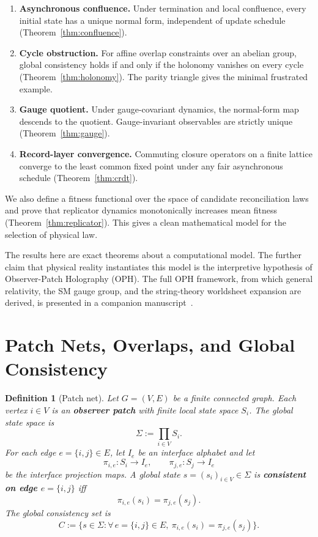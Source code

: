 \documentclass[11pt]{article}
\newtheorem{definition}[theorem]{Definition}
\begin{document}
\begin{enumerate}
\item \textbf{Asynchronous confluence.} Under termination and local confluence, every initial state has a unique normal form, independent of update schedule (Theorem~\ref{thm:confluence}).
\item \textbf{Cycle obstruction.} For affine overlap constraints over an abelian group, global consistency holds if and only if the holonomy vanishes on every cycle (Theorem~\ref{thm:holonomy}). The parity triangle gives the minimal frustrated example.
\item \textbf{Gauge quotient.} Under gauge-covariant dynamics, the normal-form map descends to the quotient. Gauge-invariant observables are strictly unique (Theorem~\ref{thm:gauge}).
\item \textbf{Record-layer convergence.} Commuting closure operators on a finite lattice converge to the least common fixed point under any fair asynchronous schedule (Theorem~\ref{thm:crdt}).
\end{enumerate}

We also define a fitness functional over the space of candidate reconciliation laws and prove that replicator dynamics monotonically increases mean fitness (Theorem~\ref{thm:replicator}). This gives a clean mathematical model for the selection of physical law.

The results here are exact theorems about a computational model. The further claim that physical reality instantiates this model is the interpretive hypothesis of Observer-Patch Holography (OPH). The full OPH framework, from which general relativity, the SM gauge group, and the string-theory worldsheet expansion are derived, is presented in a companion manuscript~\cite{OPH}.


\section{Patch Nets, Overlaps, and Global Consistency}

\begin{definition}[Patch net]\label{def:patchnet}
Let $G=(V,E)$ be a finite connected graph. Each vertex $i\in V$ is an \textbf{observer patch} with finite local state space $S_i$. The global state space is
\[
\Sigma := \prod_{i\in V} S_i.
\]
For each edge $e=\{i,j\}\in E$, let $I_e$ be an interface alphabet and let
\[
\pi_{i,e}:S_i\to I_e,
\qquad
\pi_{j,e}:S_j\to I_e
\]
be the interface projection maps. A global state $s=(s_i)_{i\in V}\in\Sigma$ is \textbf{consistent on edge $e=\{i,j\}$} iff
\[
\pi_{i,e}(s_i)=\pi_{j,e}(s_j).
\]
The global consistency set is
\[
C:=\bigl\{s\in\Sigma:\forall\, e=\{i,j\}\in E,\ \pi_{i,e}(s_i)=\pi_{j,e}(s_j)\bigr\}.
\]
\end{definition}
\end{document}
